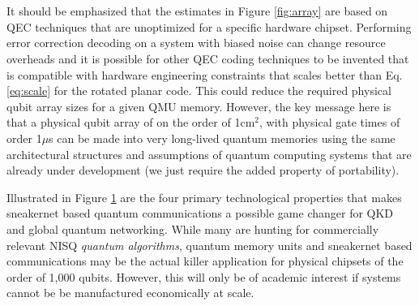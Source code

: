 \documentclass[aps,prl,twocolumn,10pt,nofootinbib]{revtex4}
\begin{document}
\\
\\
It should be emphasized that the estimates in Figure \ref{fig:array} are based on QEC techniques that are unoptimized for a specific hardware chipset.  Performing error correction decoding on a system with biased noise can change resource overheads and it is possible for other QEC coding techniques to be invented that is compatible with hardware engineering constraints that scales better than Eq. \ref{eq:scale} for the rotated planar code.  This could reduce the required physical qubit array sizes for a given QMU memory. However, the key message here is that a physical qubit array of on the order of 1cm$^2$, with physical gate times of order 1$\mu$s can be made into very long-lived quantum memories using the same architectural structures and assumptions of quantum computing systems that are already under development (we just require the added property of portability). 

\begin{figure}[ht!]
	\caption{}
	\label{fig:goal}
\end{figure}

Illustrated in Figure \ref{fig:goal} are the four primary technological properties that makes sneakernet based quantum communications a possible game changer for QKD and global quantum networking.  While many are hunting for commercially relevant NISQ {\em quantum algorithms}, quantum memory units and sneakernet based communications may be the actual killer application for physical chipsets of the order of 1,000 qubits. However, this will only be of academic interest if systems cannot be be manufactured economically at scale.
\end{document}
